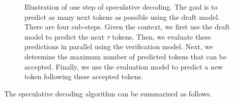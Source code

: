 \begin{figure}[!t]
\centering

\vspace{-0.5cm} \caption{Illustration of one step of speculative decoding. The goal is to predict as many next tokens as possible using the draft model. There are four sub-steps. Given the context, we first use the draft model to predict the next $\tau$ tokens. Then, we evaluate these predictions in parallel using the verification model. Next, we determine the maximum number of predicted tokens that can be accepted. Finally, we use the evaluation model to predict a new token following these accepted tokens.}
\label{fig:speculative-decoding-one-step}
\end{figure}

The speculative decoding algorithm can be summarized as follows.

